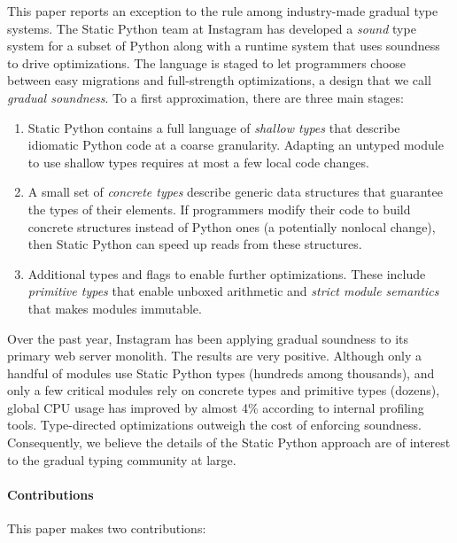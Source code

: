\documentclass[english,cleveref,submission]{programming}
\newcommand{\SP}{Static Python}
\begin{document}
This paper reports an exception to the rule among industry-made gradual type systems.
The \SP{} team at Instagram has developed a \emph{sound} type system for a subset of
Python along with a runtime system that uses soundness to drive optimizations.
The language is staged to let programmers choose between easy migrations and
full-strength optimizations, a design that we call \emph{gradual soundness}.
To a first approximation, there are three main stages:
\begin{enumerate}
  \item
    \SP{} contains a full language of \emph{shallow types}\/ that describe idiomatic
    Python code at a coarse granularity.
    Adapting an untyped module to use shallow types requires at most a few local code
    changes.
  \item
    A small set of \emph{concrete types}\/ describe generic data structures
    that guarantee the types of their elements.
    If programmers modify their code to build concrete structures instead of Python
    ones (a potentially nonlocal change), then \SP{} can speed up reads from these
    structures.
  \item
    Additional types and flags to enable further optimizations.
    These include \emph{primitive types}\/ that enable unboxed arithmetic
    and \emph{strict module semantics}\/ that makes modules immutable.
\end{enumerate}

Over the past year, Instagram has been applying gradual soundness to its
primary web server monolith.
The results are very positive.
Although only a handful of modules use \SP{} types (hundreds among thousands),
and only a few critical modules rely on concrete types and primitive types (dozens),
global CPU usage has improved by almost 4\% according to internal profiling tools.
Type-directed optimizations outweigh the cost of enforcing soundness.
Consequently, we believe the details of the \SP{} approach are of interest to
the gradual typing community at large.


\paragraph*{Contributions}
This paper makes two contributions:
\end{document}
